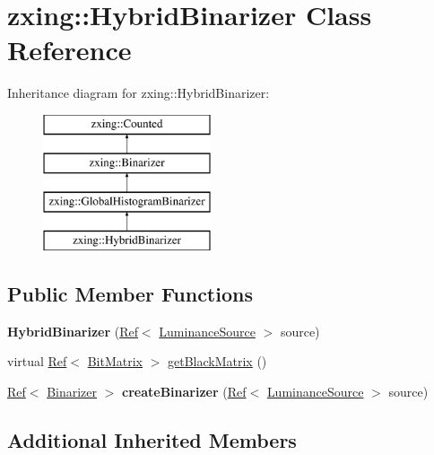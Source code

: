 \hypertarget{classzxing_1_1_hybrid_binarizer}{}\section{zxing\+:\+:Hybrid\+Binarizer Class Reference}
\label{classzxing_1_1_hybrid_binarizer}
Inheritance diagram for zxing\+:\+:Hybrid\+Binarizer\+:\begin{figure}[H]
\begin{center}
\leavevmode
\includegraphics[height=4.000000cm]{classzxing_1_1_hybrid_binarizer}
\end{center}
\end{figure}
\subsection*{Public Member Functions}
\begin{DoxyCompactItemize}
\item 
\mbox{\label{classzxing_1_1_hybrid_binarizer_a9e9bc2fbc36feb2010eed59eb8d2e743}} 
{\bfseries Hybrid\+Binarizer} (\mbox{\hyperlink{classzxing_1_1_ref}{Ref}}$<$ \mbox{\hyperlink{classzxing_1_1_luminance_source}{Luminance\+Source}} $>$ source)
\item 
virtual \mbox{\hyperlink{classzxing_1_1_ref}{Ref}}$<$ \mbox{\hyperlink{classzxing_1_1_bit_matrix}{Bit\+Matrix}} $>$ \mbox{\hyperlink{classzxing_1_1_hybrid_binarizer_a14a970ec0197b7188f64e352e9ea1e33}{get\+Black\+Matrix}} ()
\item 
\mbox{\label{classzxing_1_1_hybrid_binarizer_a131b6810592c0b9d35dabe37a50a4f8f}} 
\mbox{\hyperlink{classzxing_1_1_ref}{Ref}}$<$ \mbox{\hyperlink{classzxing_1_1_binarizer}{Binarizer}} $>$ {\bfseries create\+Binarizer} (\mbox{\hyperlink{classzxing_1_1_ref}{Ref}}$<$ \mbox{\hyperlink{classzxing_1_1_luminance_source}{Luminance\+Source}} $>$ source)
\end{DoxyCompactItemize}
\subsection*{Additional Inherited Members}


